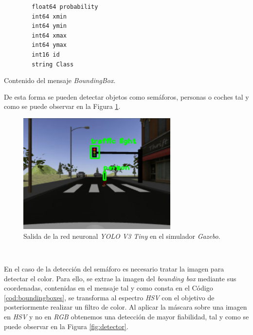 \begin{code}[h]
	\begin{lstlisting}
		float64 probability
		int64 xmin
		int64 ymin
		int64 xmax
		int64 ymax
		int16 id
		string Class
	\end{lstlisting}
	\caption[Contenido del mensaje \textit{BoundingBox}.]{Contenido del mensaje \textit{BoundingBox}.}
	\label{cod:boundingboxes}
\end{code}

De esta forma se pueden detectar objetos como semáforos, personas o coches tal y como se puede observar en la Figura \ref{fig:darknetsimulator}.\\

\begin{figure} [h!]
	\begin{center}
		\includegraphics[width=8cm]{figs/darknetSimulator}
	\end{center}
	\caption{Salida de la red neuronal \textit{YOLO V3 Tiny} en el simulador \textit{Gazebo}.}
	\label{fig:darknetsimulator}
\end{figure}\

En el caso de la detección del semáforo es necesario tratar la imagen para detectar el color. Para ello, se extrae la imagen del \textit{bounding box} mediante sus coordenadas, contenidas en el mensaje tal y como consta en el Código \ref{cod:boundingboxes}, se transforma al espectro \textit{HSV} con el objetivo de posteriormente realizar un filtro de color. Al aplicar la máscara sobre una imagen en \textit{HSV} y no en \textit{RGB} obtenemos una detección de mayor fiabilidad, tal y como se puede observar en la Figura \ref{fig:detector}.\\

